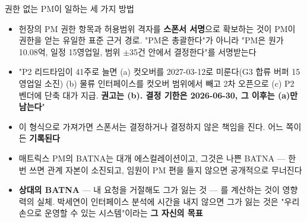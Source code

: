 \begin{frame}[allowframebreaks=1.0]{권한 없는 PM이 일하는 세 가지 방법}
\small
\par\smallskip{}\nobreak
\begin{itemize}
\item\relax 헌장의 PM 권한 항목과 허용범위 격자를 \textbf{스폰서 서명}으로 확보하는 것이 PM이 권한을 얻는 유일한 표준 근거 경로. "PM은 총괄한다"가 아니라 "PM은 원가 10.08억, 일정 15영업일, 범위 $\pm$35건 안에서 결정한다"를 서명받는다
\end{itemize}
\par\smallskip{}\nobreak
\begin{itemize}
\item\relax "P2 리드타임이 41주로 늘면 (a) 컷오버를 2027-03-12로 미룬다(G3 합류 버퍼 15영업일 소진) (b) 물류 인터페이스를 컷오버 범위에서 빼고 2차 오픈으로 (c) P2 벤더에 단축 대가 지급. \textbf{권고는 (b). 결정 기한은 2026-06-30, 그 이후는 (a)만 남는다}"
\item\relax 이 형식으로 가져가면 스폰서는 결정하거나 결정하지 않은 책임을 진다. 어느 쪽이든 \textbf{기록된다}
\end{itemize}
\par\smallskip{}\nobreak
\begin{itemize}
\item\relax 매트릭스 PM의 BATNA는 대개 에스컬레이션이고, 그것은 나쁜 BATNA — 한 번 쓰면 관계 자본이 소진되고, 임원이 PM 편을 들지 않으면 공개적으로 무너진다
\item\relax \textbf{상대의 BATNA} — 내 요청을 거절해도 그가 잃는 것 — 를 계산하는 것이 영향력의 실체. 박세연이 인터페이스 분석에 시간을 내지 않으면 그가 잃는 것은 "우리 손으로 운영할 수 있는 시스템"이라는 \textbf{그 자신의 목표}
\end{itemize}
\end{frame}

